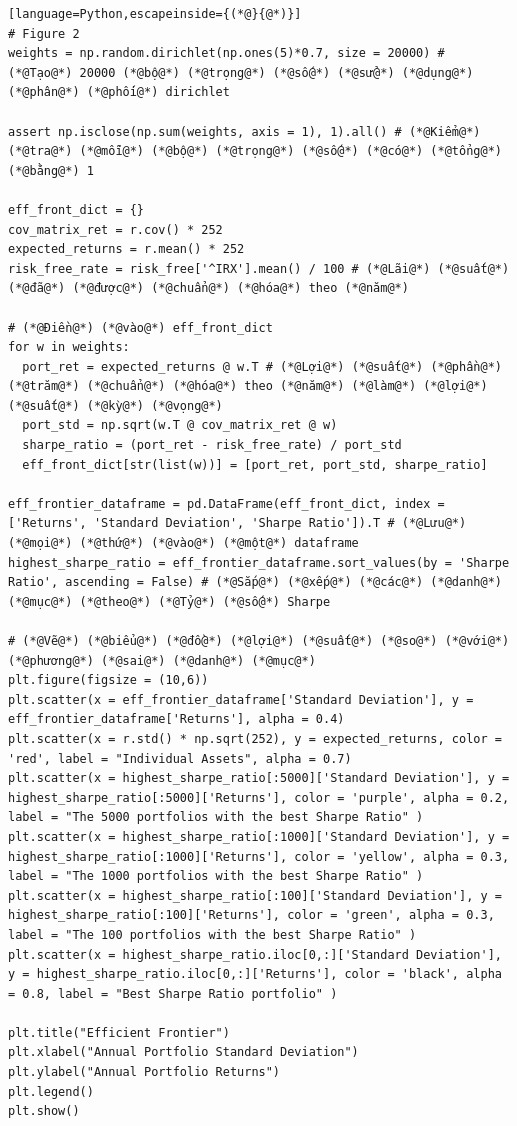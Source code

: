 \begin{lstlisting}[language=Python,escapeinside={(*@}{@*)}]
# Figure 2
weights = np.random.dirichlet(np.ones(5)*0.7, size = 20000) # (*@Tạo@*) 20000 (*@bộ@*) (*@trọng@*) (*@số@*) (*@sử@*) (*@dụng@*) (*@phân@*) (*@phối@*) dirichlet

assert np.isclose(np.sum(weights, axis = 1), 1).all() # (*@Kiểm@*) (*@tra@*) (*@mỗi@*) (*@bộ@*) (*@trọng@*) (*@số@*) (*@có@*) (*@tổng@*) (*@bằng@*) 1

eff_front_dict = {}
cov_matrix_ret = r.cov() * 252
expected_returns = r.mean() * 252
risk_free_rate = risk_free['^IRX'].mean() / 100 # (*@Lãi@*) (*@suất@*) (*@đã@*) (*@được@*) (*@chuẩn@*) (*@hóa@*) theo (*@năm@*)

# (*@Điền@*) (*@vào@*) eff_front_dict
for w in weights:
  port_ret = expected_returns @ w.T # (*@Lợi@*) (*@suất@*) (*@phần@*) (*@trăm@*) (*@chuẩn@*) (*@hóa@*) theo (*@năm@*) (*@làm@*) (*@lợi@*) (*@suất@*) (*@kỳ@*) (*@vọng@*)
  port_std = np.sqrt(w.T @ cov_matrix_ret @ w)
  sharpe_ratio = (port_ret - risk_free_rate) / port_std
  eff_front_dict[str(list(w))] = [port_ret, port_std, sharpe_ratio]

eff_frontier_dataframe = pd.DataFrame(eff_front_dict, index = ['Returns', 'Standard Deviation', 'Sharpe Ratio']).T # (*@Lưu@*) (*@mọi@*) (*@thứ@*) (*@vào@*) (*@một@*) dataframe
highest_sharpe_ratio = eff_frontier_dataframe.sort_values(by = 'Sharpe Ratio', ascending = False) # (*@Sắp@*) (*@xếp@*) (*@các@*) (*@danh@*) (*@mục@*) (*@theo@*) (*@Tỷ@*) (*@số@*) Sharpe

# (*@Vẽ@*) (*@biểu@*) (*@đồ@*) (*@lợi@*) (*@suất@*) (*@so@*) (*@với@*) (*@phương@*) (*@sai@*) (*@danh@*) (*@mục@*)
plt.figure(figsize = (10,6))
plt.scatter(x = eff_frontier_dataframe['Standard Deviation'], y = eff_frontier_dataframe['Returns'], alpha = 0.4)
plt.scatter(x = r.std() * np.sqrt(252), y = expected_returns, color = 'red', label = "Individual Assets", alpha = 0.7)
plt.scatter(x = highest_sharpe_ratio[:5000]['Standard Deviation'], y = highest_sharpe_ratio[:5000]['Returns'], color = 'purple', alpha = 0.2, label = "The 5000 portfolios with the best Sharpe Ratio" )
plt.scatter(x = highest_sharpe_ratio[:1000]['Standard Deviation'], y = highest_sharpe_ratio[:1000]['Returns'], color = 'yellow', alpha = 0.3, label = "The 1000 portfolios with the best Sharpe Ratio" )
plt.scatter(x = highest_sharpe_ratio[:100]['Standard Deviation'], y = highest_sharpe_ratio[:100]['Returns'], color = 'green', alpha = 0.3, label = "The 100 portfolios with the best Sharpe Ratio" )
plt.scatter(x = highest_sharpe_ratio.iloc[0,:]['Standard Deviation'], y = highest_sharpe_ratio.iloc[0,:]['Returns'], color = 'black', alpha = 0.8, label = "Best Sharpe Ratio portfolio" )

plt.title("Efficient Frontier")
plt.xlabel("Annual Portfolio Standard Deviation")
plt.ylabel("Annual Portfolio Returns")
plt.legend()
plt.show()
\end{lstlisting}

